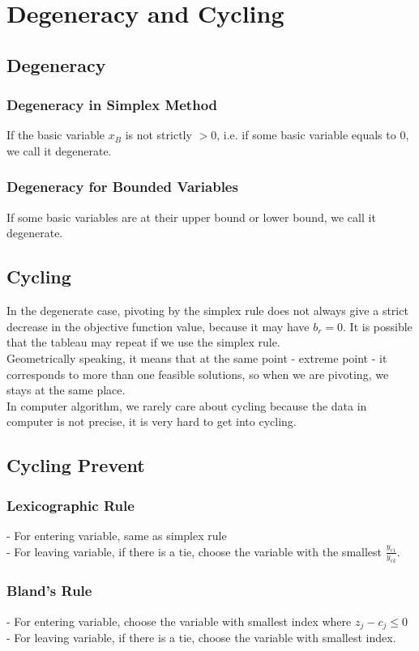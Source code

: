 		\section{Degeneracy and Cycling}
			\subsection{Degeneracy}
				\subsubsection{Degeneracy in Simplex Method}
					If the basic variable $x_B$ is not strictly $> 0$, i.e. if some basic variable equals to 0, we call it degenerate.

				\subsubsection{Degeneracy for Bounded Variables}
					If some basic variables are at their upper bound or lower bound, we call it degenerate.

			\subsection{Cycling}
				In the degenerate case, pivoting by the simplex rule does not always give a strict decrease in the objective function value, because it may have $b_r = 0$. It is possible that the tableau may repeat if we use the simplex rule.\\
				Geometrically speaking, it means that at the same point - extreme point - it corresponds to more than one feasible solutions, so when we are pivoting, we stays at the same place.\\
				In computer algorithm, we rarely care about cycling because the data in computer is not precise, it is very hard to get into cycling.

			\subsection{Cycling Prevent}
				\subsubsection{Lexicographic Rule}
					- For entering variable, same as simplex rule\\
					- For leaving variable, if there is a tie, choose the variable with the smallest $\frac{y_{r1}}{y_{rk}}$.

				\subsubsection{Bland's Rule}
					- For entering variable, choose the variable with smallest index where $z_j - c_j \le 0$\\
					- For leaving variable, if there is a tie, choose the variable with smallest index.


